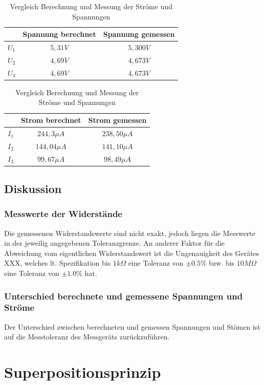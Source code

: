 \documentclass[12pt,a4paper,titlepage]{article}
\begin{document}
\begin{table}[H]
  \centering
  \begin{tabular}{|c|c|c|}
  \hline
  ~  & Spannung berechnet & Spannung gemessen \\ \hline
  $U_1$ & $5,31 V$             & $5,300 V$            \\ \hline
  $U_2$ & $4,69 V$             & $4,673 V$            \\ \hline
  $U_3$ & $4,69 V$             & $4,673 V$            \\ \hline
  \end{tabular}
  \begin{tabular}{|c|c|c|}
  \hline
  ~  & Strom berechnet & Strom gemessen \\ \hline
  $I_1$ & $244,3 \mu A$       & $238,50 \mu A$     \\ \hline
  $I_2$ & $144,04 \mu A$      & $141,10 \mu A$     \\ \hline
  $I_3$ & $99,67 \mu A$       & $98,49 \mu A$      \\ \hline
  \end{tabular}
  \caption{Vergleich Berechnung und Messung der Str\"ome und Spannungen}
  \label{Figure3.3.4}
\end{table}

\subsection{Diskussion}
\subsubsection{Messwerte der Widerst\"ande}
Die gemessenen Widerstandswerte sind nicht exakt, jedoch liegen die Messwerte in der jeweilig angegebenen Toleranzgrenze. An anderer Faktor f\"ur die Abweichung vom eigentlichen Widerstandswert ist die Ungenauigkeit des Ger\"ates XXX, welches lt. Spezifikation bis $1k \Omega$ eine Toleranz von $\pm0.5\%$ bzw. bis $10 M\Omega$ eine Toleranz von $\pm1.0\%$ hat.

\subsubsection{Unterschied berechnete und gemessene Spannungen und Str\"ome}
Der Unterschied zwischen berechneten und gemessen Spannungen und St\"omen ist auf die Messtoleranz des Messger\"ats zur\"uckzuf\"uhren.


\pagebreak
\section{Superpositionsprinzip}
\end{document}
